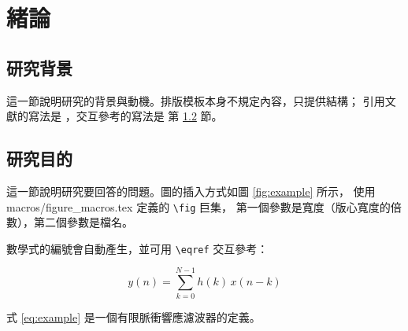 
\chapter{緒論}
\label{ch:introduction}

\section{研究背景}
\label{sec:background}

這一節說明研究的背景與動機。排版模板本身不規定內容，只提供結構；
引用文獻的寫法是 \cite{lamport1994latex}，交互參考的寫法是
第 \ref{sec:objectives} 節。

\section{研究目的}
\label{sec:objectives}

這一節說明研究要回答的問題。圖的插入方式如圖 \ref{fig:example} 所示，
使用 macros/figure\_macros.tex 定義的 \verb|\fig| 巨集，
第一個參數是寬度（版心寬度的倍數），第二個參數是檔名。


數學式的編號會自動產生，並可用 \verb|\eqref| 交互參考：

\begin{equation}
  \label{eq:example}
  y(n) = \sum_{k=0}^{N-1} h(k)\, x(n-k)
\end{equation}

式 \eqref{eq:example} 是一個有限脈衝響應濾波器的定義。
